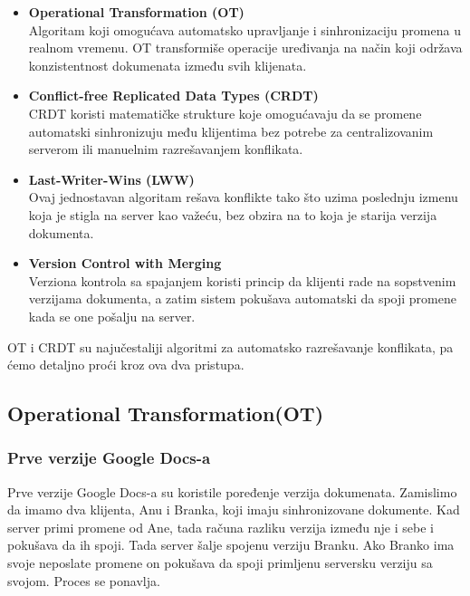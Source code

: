 \documentclass[12pt]{article}
\begin{document}
    \begin{itemize}
        \item \textbf{Operational Transformation (OT)} \\
        Algoritam koji omogućava automatsko upravljanje i sinhronizaciju promena u realnom vremenu. OT transformiše operacije uređivanja na način koji održava konzistentnost dokumenata između svih klijenata.
        
        \item \textbf{Conflict-free Replicated Data Types (CRDT)} \\
        CRDT koristi matematičke strukture koje omogućavaju da se promene automatski sinhronizuju među klijentima bez potrebe za centralizovanim serverom ili manuelnim razrešavanjem konflikata.
        
        \item \textbf{Last-Writer-Wins (LWW)} \\
        Ovaj jednostavan algoritam rešava konflikte tako što uzima poslednju izmenu koja je stigla na server kao važeću, bez obzira na to koja je starija verzija dokumenta.
        
        \item \textbf{Version Control with Merging} \\
        Verziona kontrola sa spajanjem koristi princip da klijenti rade na sopstvenim verzijama dokumenta, a zatim sistem pokušava automatski da spoji promene kada se one pošalju na server.

    \end{itemize}

    OT i CRDT su najučestaliji algoritmi za automatsko razrešavanje konflikata, pa ćemo detaljno proći kroz ova dva pristupa.

    \subsection{Operational Transformation(OT)}

    \subsubsection{Prve verzije Google Docs-a}

    Prve verzije Google Docs-a su koristile poređenje verzija dokumenata. Zamislimo da imamo dva klijenta, Anu i Branka, koji imaju sinhronizovane dokumente. Kad server primi promene od Ane, tada računa razliku verzija između nje i sebe i pokušava da ih spoji. Tada server šalje spojenu verziju Branku. Ako Branko ima svoje neposlate promene on pokušava da spoji primljenu serversku verziju sa svojom. Proces se ponavlja.
\end{document}
